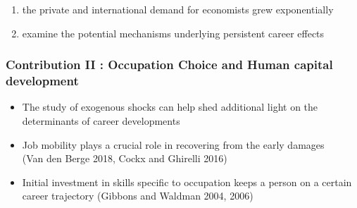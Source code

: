\documentclass[10pt,svgnames,fragile]{beamer}
\begin{document}
{\begin{frame}
\begin{itemize}
\begin{enumerate}
			\item the private and international demand for economists grew exponentially 
		\vspace{2 mm}
			\item examine the potential mechanisms underlying persistent career effects
		\end{enumerate}
\vfill
	\end{itemize}
\end{frame}




{
\begin{frame}
	\frametitle{Contribution II : Occupation Choice and Human capital development} 
	\begin{itemize}
		\item The study of exogenous shocks can help shed additional light on the determinants of career developments
\vfill
		\item Job mobility plays a crucial role in recovering from the early damages\\  (Van den Berge 2018, Cockx and Ghirelli 2016) 
\vfill
			\item Initial investment in skills specific to occupation keeps a person on a certain career trajectory (Gibbons and Waldman 2004, 2006)

\end{itemize}
\end{frame}}}
\end{document}
